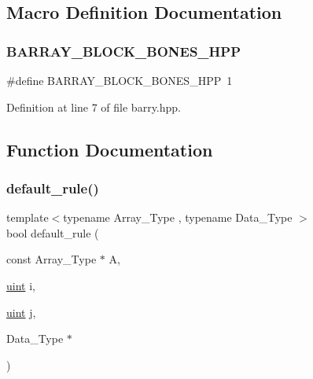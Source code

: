 \subsection{Macro Definition Documentation}
\mbox{\label{barry_8hpp_a5a519f04c220117f3def1740e0944be7}} 
\subsubsection{\texorpdfstring{B\+A\+R\+R\+A\+Y\+\_\+\+B\+L\+O\+C\+K\+\_\+\+B\+O\+N\+E\+S\+\_\+\+H\+PP}{BARRAY\_BLOCK\_BONES\_HPP}}
{\footnotesize\ttfamily \#define B\+A\+R\+R\+A\+Y\+\_\+\+B\+L\+O\+C\+K\+\_\+\+B\+O\+N\+E\+S\+\_\+\+H\+PP~1}



Definition at line 7 of file barry.\+hpp.



\subsection{Function Documentation}
\mbox{\label{block-bones_8hpp_a4aff3c5c755b16bc4634ab8d8e7fb3f6}} 
\subsubsection{\texorpdfstring{default\+\_\+rule()}{default\_rule()}}
{\footnotesize\ttfamily template$<$typename Array\+\_\+\+Type , typename Data\+\_\+\+Type $>$ \\
bool default\+\_\+rule (\begin{DoxyParamCaption}\item[{const Array\+\_\+\+Type $\ast$}]{A,  }\item[{\hyperlink{typedefs_8hpp_a91ad9478d81a7aaf2593e8d9c3d06a14}{uint}}]{i,  }\item[{\hyperlink{typedefs_8hpp_a91ad9478d81a7aaf2593e8d9c3d06a14}{uint}}]{j,  }\item[{Data\+\_\+\+Type $\ast$}]{ }\end{DoxyParamCaption})\hspace{0.3cm}{\ttfamily [inline]}}



